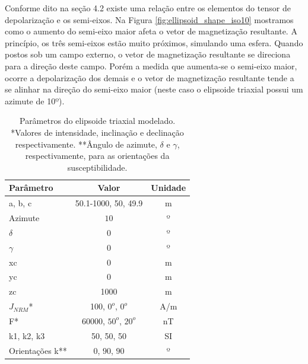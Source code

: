 Conforme dito na seção 4.2 existe uma relação entre os elementos do tensor de depolarização e os semi-eixos. Na Figura \ref{fig:ellipsoid_shape_iso10} mostramos como o aumento do semi-eixo maior afeta o vetor de magnetização resultante. A princípio, os três semi-eixos estão muito próximos, simulando uma esfera. Quando postos sob um campo externo, o vetor de magnetização resultante se direciona para a direção deste campo. Porém a medida que aumenta-se o semi-eixo maior, ocorre a depolarização dos demais e o vetor de magnetização resultante tende a se alinhar na direção do semi-eixo maior (neste caso o elipsoide triaxial possui um azimute de 10$º$).

\vspace{4cm}

\begin{table}[h!]
	\begin{center}
		\begin{tabular}{|l|c|c|}
			\hline
			\textbf{Parâmetro}  & \textbf{Valor}  & \textbf{Unidade }\\
			\hline 
			a, b, c  & 50.1-1000, 50, 49.9 & m\\
			\hline
			Azimute   & $10$ & º \\
			\hline
			$\delta$    & $0$ & º\\
			\hline
			$\gamma$   & $0$  & º\\
			\hline
			xc   & 0  & m\\
			\hline          
			yc   & 0  & m\\
			\hline                
			zc   & 1000  & m\\
			\hline
			$J_{NRM}$*  & 100, $0^o$, $0^o$ & A/m \\
			\hline
			F*    & 60000, $50^o$, $20^o$ & nT\\
			\hline
			k1, k2, k3   & 50, 50, 50  & SI\\
			\hline
			Orientações k**   & $0$, $90$, $90$  & º\\
			\hline
		\end{tabular}
		\caption{Parâmetros do elipsoide triaxial modelado. *Valores de intensidade, inclinação e declinação respectivamente. **Ângulo de azimute, $\delta$ e $\gamma$, respectivamente, para as orientações da susceptibilidade.}
	\end{center}
	\label{tab:ellipsoid_shape_iso10}
\end{table}


